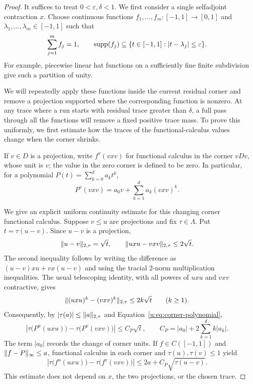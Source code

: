 \begin{proof}
It suffices to treat $0<\varepsilon,\delta<1$.  We first consider a
single selfadjoint contraction $x$.  Choose continuous functions
$f_1,\ldots,f_m:[-1,1]\to[0,1]$ and $\lambda_1,\ldots,\lambda_m\in[-1,1]$
such that
\[
 \sum_{j=1}^m f_j=1,
 \qquad
 \operatorname{supp}(f_j)\subseteq
 \{t\in[-1,1]:|t-\lambda_j|\le\varepsilon\}.
\]
For example, piecewise linear hat functions on a sufficiently fine
finite subdivision give such a partition of unity.

We will repeatedly apply these functions inside the current residual
corner and remove a projection supported where the corresponding
function is nonzero.  At any trace where a run starts with residual
trace greater than $\delta$, a full pass through all the functions will
remove a fixed positive trace mass.  To prove this uniformly, we first
estimate how the traces of the functional-calculus values change when
the corner shrinks.

If $v\in D$ is a projection, write $f^v(vxv)$ for functional calculus in the corner
$vDv$, whose unit is $v$; the value in the zero corner is defined to be
zero.  In particular, for a polynomial $P(t)=\sum_{k=0}^d a_kt^k$,
\begin{equation}
\label{u:eq:corner-polynomial}
 P^v(vxv)=a_0v+\sum_{k=1}^d a_k(vxv)^k.
\end{equation}

We give an explicit uniform continuity estimate for this changing
corner functional calculus.  Suppose $v\le u$ are projections and fix
$\tau\in\Lambda$.  Put $t=\tau(u-v)$.  Since $u-v$ is a projection,
\[
 \lVert u-v\rVert_{2,\tau}=\sqrt t,
 \qquad
 \lVert uxu-vxv\rVert_{2,\tau}\le2\sqrt t.
\]
The second inequality follows by writing the difference as
$(u-v)xu+vx(u-v)$ and using the tracial $2$-norm multiplication
inequalities.  The usual telescoping identity, with all powers of
$uxu$ and $vxv$ contractive, gives
\[
 \lVert(uxu)^k-(vxv)^k\rVert_{2,\tau}\le 2k\sqrt t
 \qquad(k\ge1).
\]
Consequently, by $|\tau(a)|\le\lVert a\rVert_{2,\tau}$ and
Equation~\eqref{u:eq:corner-polynomial},
\[
 \left|\tau\bigl(P^u(uxu)\bigr)
          -\tau\bigl(P^v(vxv)\bigr)\right|
 \le C_P\sqrt t,
 \qquad
 C_P=|a_0|+2\sum_{k=1}^d k|a_k|.
\]
The term $|a_0|$ records the change of corner units.  If
$f\in C([-1,1])$ and $\lVert f-P\rVert_\infty\le a$, functional calculus in
each corner and $\tau(u),\tau(v)\le1$ yield
\begin{equation}
\label{u:eq:moving-corner-modulus}
 \left|\tau\bigl(f^u(uxu)\bigr)
          -\tau\bigl(f^v(vxv)\bigr)\right|
 \le 2a+C_P\sqrt{\tau(u-v)}.
\end{equation}
This estimate does not depend on $x$, the two projections, or the
chosen trace.


\end{proof}
